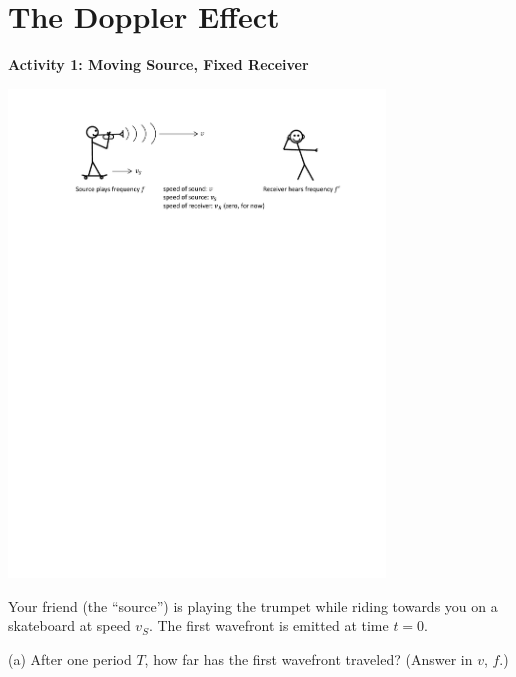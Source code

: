 \section{The Doppler Effect}

\makelabheader %

\vspace{0.1in}
%


\textbf{Activity 1: Moving Source, Fixed Receiver}

\begin{center}
\includegraphics[width=0.75\textwidth]{doppler_shift/moving_source.pdf}
\end{center}

Your friend (the ``source'') is playing the trumpet while riding towards you on a skateboard at speed $v_S$.  The first wavefront is emitted at time $t=0$.

(a) After one period $T$, how far has the first wavefront traveled?  (Answer in $v$, $f$.)
\vspace{1.0in}


